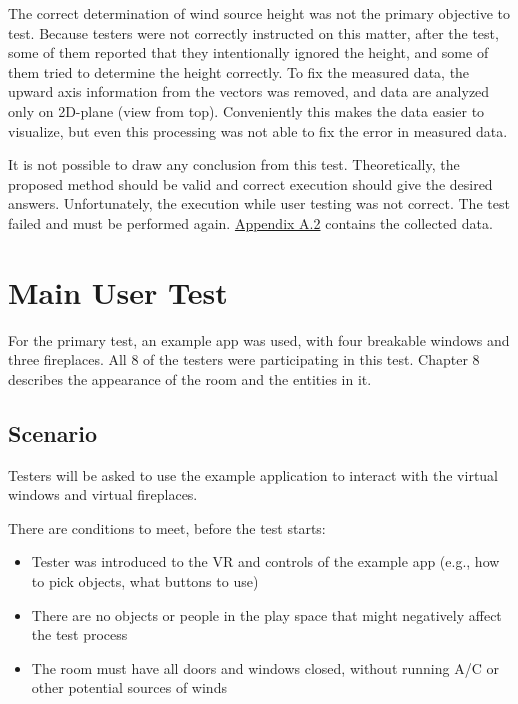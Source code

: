 The correct determination of wind source height was not the primary
objective to test. Because testers were not correctly instructed on this matter,
after the test, some of them reported that they intentionally ignored the
height, and some of them tried to determine the height correctly.
To fix the measured data, the upward axis information from the vectors was
removed, and data are analyzed only on 2D-plane (view from top).
Conveniently this makes the data easier to visualize, but even this
processing was not able to fix the error in measured data.

It is not possible to draw any conclusion from this test. Theoretically, the
proposed method should be valid and correct execution should give the
desired answers. Unfortunately, the execution while user testing was not
correct. The test failed and must be performed again. 
\hyperref[appx:a]{Appendix A.2} contains the collected data.


\hypertarget{x-main-user-test}{\section{Main User Test}}
For the primary test, an example app was used, with four breakable windows
and three fireplaces. All 8 of the testers were participating
in this test. Chapter 8 describes the appearance of the room and the entities in it.

\hypertarget{x-scenario}{\subsection{Scenario}}
Testers will be asked to use the example application to interact with 
the virtual windows and virtual fireplaces.

There are conditions to meet, before the test starts:

\begin{itemize}
    \itemsep0em

\item Tester was introduced to the VR and controls of
the example app (e.g., how to pick objects, what buttons to use)

\item There are no objects or people in the play space that might negatively affect
the test process

\item The room must have all doors and windows closed, without running A/C
or other potential sources of winds

\end{itemize}


